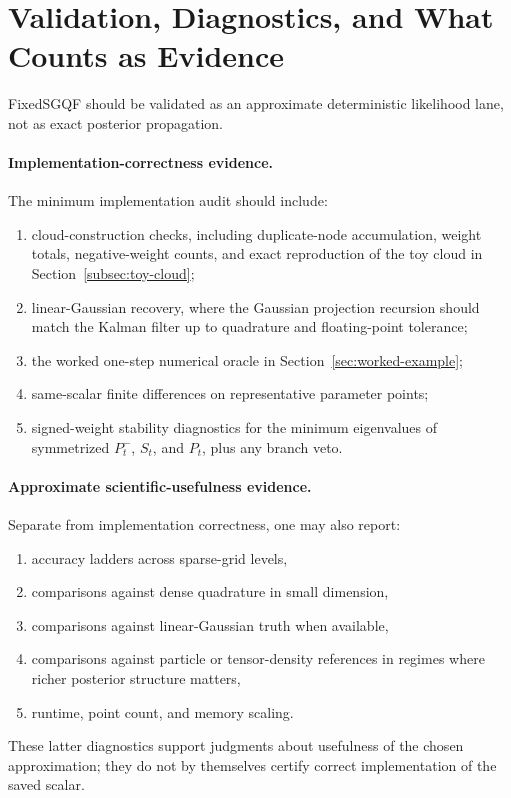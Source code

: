 \documentclass[11pt]{article}
\numberwithin{equation}{section}
\begin{document}
\section{Validation, Diagnostics, and What Counts as Evidence}
\label{sec:validation}

FixedSGQF should be validated as an approximate deterministic likelihood lane,
not as exact posterior propagation.

\paragraph{Implementation-correctness evidence.}
The minimum implementation audit should include:
\begin{enumerate}[leftmargin=0.3in]
  \item cloud-construction checks, including duplicate-node accumulation, weight
  totals, negative-weight counts, and exact reproduction of the toy cloud in
  Section~\ref{subsec:toy-cloud};
  \item linear-Gaussian recovery, where the Gaussian projection recursion should
  match the Kalman filter up to quadrature and floating-point tolerance;
  \item the worked one-step numerical oracle in
  Section~\ref{sec:worked-example};
  \item same-scalar finite differences on representative parameter points;
  \item signed-weight stability diagnostics for the minimum eigenvalues of
  symmetrized \(P_t^-\), \(S_t\), and \(P_t\), plus any branch veto.
\end{enumerate}

\paragraph{Approximate scientific-usefulness evidence.}
Separate from implementation correctness, one may also report:
\begin{enumerate}[leftmargin=0.3in]
  \item accuracy ladders across sparse-grid levels,
  \item comparisons against dense quadrature in small dimension,
  \item comparisons against linear-Gaussian truth when available,
  \item comparisons against particle or tensor-density references in regimes
  where richer posterior structure matters,
  \item runtime, point count, and memory scaling.
\end{enumerate}
These latter diagnostics support judgments about usefulness of the chosen
approximation; they do not by themselves certify correct implementation of the
saved scalar.
\end{document}
